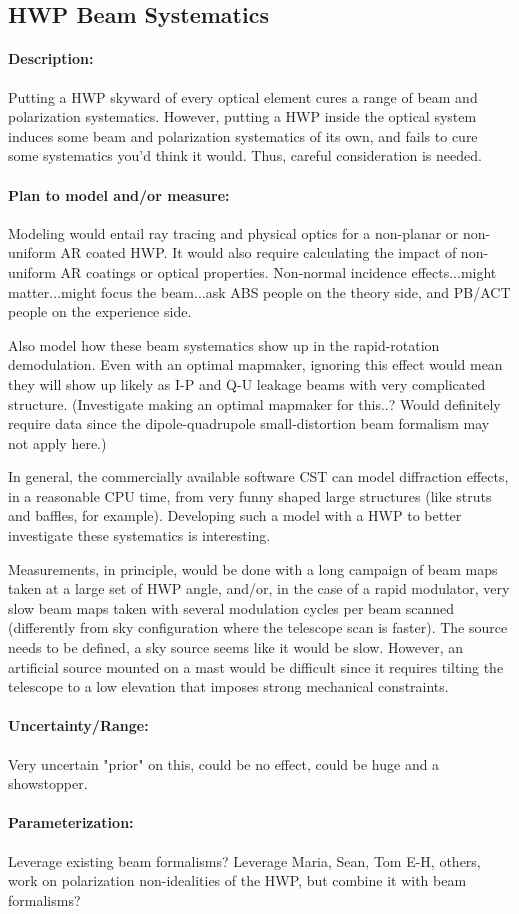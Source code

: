 
\subsection{HWP Beam Systematics}


\paragraph{Description:}
Putting a HWP skyward of every optical element cures a range of beam and polarization systematics. However, putting a HWP inside the optical system induces some beam and polarization systematics of its own, and fails to cure some systematics you'd think it would. Thus, careful consideration is needed.

\paragraph{Plan to model and/or measure:}
Modeling would entail ray tracing and physical optics for a non-planar or non-uniform AR coated HWP. It would also require calculating the impact of non-uniform AR coatings or optical properties. Non-normal incidence effects...might matter...might focus the beam...ask ABS people on the theory side, and PB/ACT people on the experience side.

Also model how these beam systematics show up in the rapid-rotation demodulation. Even with an optimal mapmaker, ignoring this effect would mean they will show up likely as I-P and Q-U leakage beams with very complicated structure. (Investigate making an optimal mapmaker for this..? Would definitely require data since the dipole-quadrupole small-distortion beam formalism may not apply here.)

In general, the commercially available software CST can model diffraction effects, in a reasonable CPU time, from very funny shaped large structures (like struts and baffles, for example). Developing such a model with a HWP to better investigate these systematics is interesting.

Measurements, in principle, would be done with a long campaign of beam maps taken at a large set of HWP angle, and/or, in the case of a rapid modulator, very slow beam maps taken with several modulation cycles per beam scanned (differently from sky configuration where the telescope scan is faster). The source needs to be defined, a sky source seems like it would be slow. However, an artificial source mounted on a mast would be difficult since it requires tilting the telescope to a low elevation that imposes strong mechanical constraints.

\paragraph{Uncertainty/Range:}
Very uncertain "prior" on this, could be no effect, could be huge and a showstopper.

\paragraph{Parameterization:}

Leverage existing beam formalisms? Leverage Maria, Sean, Tom E-H, others, work on polarization non-idealities of the HWP, but combine it with beam formalisms?
